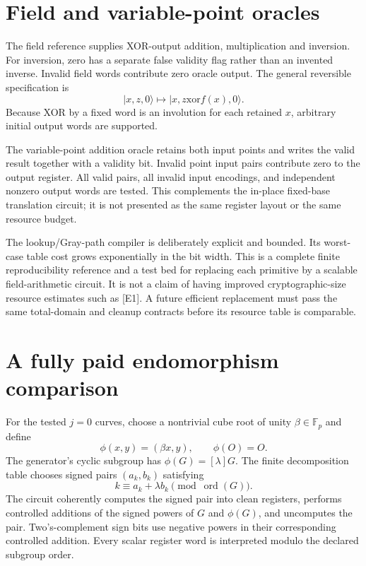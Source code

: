 \section{Field and variable-point oracles}

The field reference supplies XOR-output addition, multiplication and inversion. For inversion, zero has a separate false validity flag rather than an invented inverse. Invalid field words contribute zero oracle output. The general reversible specification is
\[
 |x,z,0\rangle\longmapsto|x,z\mathbin{\mathrm{xor}}f(x),0\rangle.
\]
Because XOR by a fixed word is an involution for each retained $x$, arbitrary initial output words are supported.

The variable-point addition oracle retains both input points and writes the valid result together with a validity bit. Invalid point input pairs contribute zero to the output register. All valid pairs, all invalid input encodings, and independent nonzero output words are tested. This complements the in-place fixed-base translation circuit; it is not presented as the same register layout or the same resource budget.

The lookup/Gray-path compiler is deliberately explicit and bounded. Its worst-case table cost grows exponentially in the bit width. This is a complete finite reproducibility reference and a test bed for replacing each primitive by a scalable field-arithmetic circuit. It is not a claim of having improved cryptographic-size resource estimates such as [E1]. A future efficient replacement must pass the same total-domain and cleanup contracts before its resource table is comparable.

\section{A fully paid endomorphism comparison}

For the tested $j=0$ curves, choose a nontrivial cube root of unity $\beta\in\mathbb F_p$ and define
\[
 \phi(x,y)=(\beta x,y),\qquad \phi(O)=O.
\]
The generator's cyclic subgroup has $\phi(G)=[\lambda]G$. The finite decomposition table chooses signed pairs $(a_k,b_k)$ satisfying
\[
 k\equiv a_k+\lambda b_k\pmod{\operatorname{ord}(G)}.
\]
The circuit coherently computes the signed pair into clean registers, performs controlled additions of the signed powers of $G$ and $\phi(G)$, and uncomputes the pair. Two's-complement sign bits use negative powers in their corresponding controlled addition. Every scalar register word is interpreted modulo the declared subgroup order.

